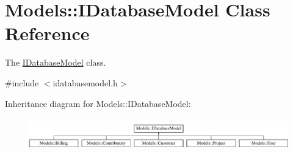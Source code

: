 \hypertarget{classModels_1_1IDatabaseModel}{\section{Models\+:\+:I\+Database\+Model Class Reference}
\label{classModels_1_1IDatabaseModel}
}


The \hyperlink{classModels_1_1IDatabaseModel}{I\+Database\+Model} class.  




{\ttfamily \#include $<$idatabasemodel.\+h$>$}

Inheritance diagram for Models\+:\+:I\+Database\+Model\+:\begin{figure}[H]
\begin{center}
\leavevmode
\includegraphics[height=1.417722cm]{df/ddd/classModels_1_1IDatabaseModel}
\end{center}
\end{figure}
